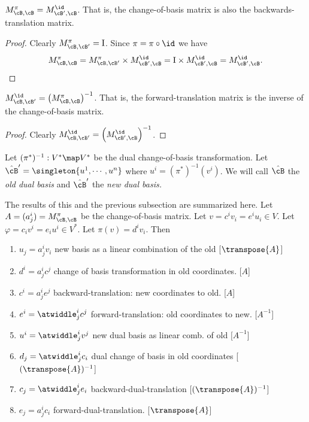 \documentclass[oneside,12pt]{amsart}
\begin{document}
\begin{lemma}
$M^{\pi}_{\cB,\cB} = M^{\id}_{\cB^{\prime},\cB}$. That is, the change-of-basis
matrix is also the backwards-translation matrix.
\end{lemma}
\begin{proof}
Clearly $M^{\pi}_{\cB,\cB^{\prime}} = \mathrm{I}$.
Since $\pi = \pi \circ \id$ we have
$$M^{\pi}_{\cB,\cB} = M^{\pi}_{\cB,\cB^{\prime}} \times M^{\id}_{\cB^{\prime},\cB} 
= \mathrm{I} \times M^{\id}_{\cB^{\prime},\cB} =  M^{\id}_{\cB^{\prime},\cB}.$$
\end{proof}

\begin{corollary}
$M^{\id}_{\cB,\cB^{\prime}} = \left(M^{\pi}_{\cB,\cB}\right)^{-1}$. That is, the forward-translation matrix
is the inverse of the change-of-basis matrix.
\end{corollary}
\begin{proof}
Clearly $M^{\id}_{\cB,\cB^{\prime}} = \left(M^{\id}_{\cB^{\prime},\cB}\right)^{-1}$.
\end{proof}

Let $(\pi^*)^{-1}: V^* \map V^*$ be the dual change-of-basis transformation. 
Let $\hat{\cB}^{\prime} = \singleton{u^1,\cdots,u^n}$
where $u^i = (\pi^*)^{-1}(v^i)$. We will call $\hat{\cB}$ the \emph{old dual basis} and $\hat{\cB}^{\prime}$ the
\emph{new dual basis.}

\begin{remarks}
\label{main-remarks}
The results of this and the previous subsection are summarized here.
Let $A = (a^i_j) = M^{\pi}_{\cB,\cB}$ be the change-of-basis matrix. Let $v = c^i v_i = e^i u_i\in V$.
Let $\varphi = c_i v^i = e_i u^i \in V^*$. Let $\pi(v) = d^i v_i$. Then
\begin{enumerate}
\item $u_j = a^i_j v_i$ new basis as a linear combination of the old [$\transpose{A}$]
\item $d^i = a^i_j c^j$ change of basis transformation in old coordinates. [$A$]
\item $c^i = a^i_j e^j$ backward-translation: new coordinates to old. [$A$]
\item $e^i = \atwiddle^i_j c^j$ forward-translation: old coordinates to new. [$A^{-1}$]
\item $u^i = \atwiddle^i_j v^j$ new dual basis as linear comb. of old $[A^{-1}$]
\item $d_j = \atwiddle^i_j c_i$ dual change of basis in old coordinates [$(\transpose{A})^{-1}$]
\item $c_j = \atwiddle^i_j e_i$ backward-dual-translation [$(\transpose{A})^{-1}$]
\item $e_j = a^i_j c_i$ forward-dual-translation. [$\transpose{A}$]
\end{enumerate}
\end{remarks}
\end{document}
